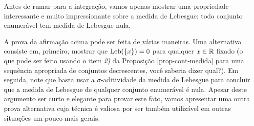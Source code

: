        Antes de rumar para a integração, 
        vamos apenas mostrar uma propriedade interessante e muito impressionante
        sobre a medida de Lebesgue: 
        todo conjunto enumerável tem medida de Lebesgue nula.
       
        A prova da afirmação acima pode ser feita de várias maneiras.
        Uma alternativa consiste em, primeiro, mostrar 
        que $\mathrm{Leb}(\{x\})=0$ para qualquer $x\in\mathbb{R}$ fixado
        (o que pode ser feito usando o item {\it 2)} da 
        Proposição \ref{prop-cont-medida} para uma sequência apropriada de conjuntos
        decrescentes, você saberia dizer qual?). Em seguida, note que 
        basta usar a $\sigma$-aditividade da medida de Lebesgue 
        para concluir que a medida de Lebesgue de qualquer conjunto 
        enumerável é nula. 
        Apesar deste argumento ser curto e elegante para provar
        este fato, vamos apresentar uma outra prova alternativa
        cuja técnica é valiosa por ser também utilizável em outras 
        situações um pouco mais gerais. 
       
